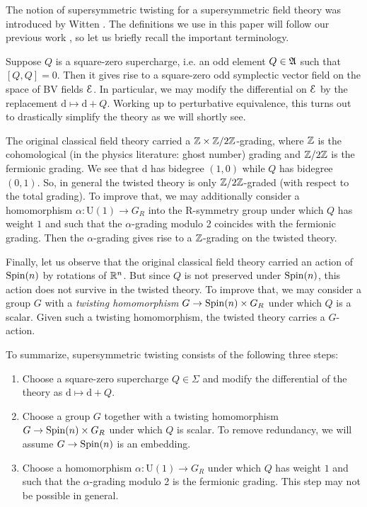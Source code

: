 \documentclass[10pt, oneside]{article}
\renewcommand{\U}{\mathrm{U}}
\begin{document}
The notion of supersymmetric twisting for a supersymmetric field theory was introduced by Witten \cite{WittenTQFT}. The definitions we use in this paper will follow our previous work \cite{ElliottSafronov}, so let us briefly recall the important terminology.

Suppose $Q$ is a square-zero supercharge, i.e. an odd element $Q\in\mathfrak A$ such that $[Q, Q]=0$. Then it gives rise to a square-zero odd symplectic vector field on the space of BV fields $\mathcal E$. In particular, we may modify the differential on $\mathcal E$ by the replacement $\mathrm{d}\mapsto \mathrm{d}+Q$. Working up to perturbative equivalence, this turns out to drastically simplify the theory as we will shortly see.

The original classical field theory carried a $\mathbb Z\times\mathbb Z/2\mathbb Z$-grading, where $\mathbb Z$ is the cohomological (in the physics literature: ghost number) grading and $\mathbb Z/2\mathbb Z$ is the fermionic grading. We see that $\mathrm{d}$ has bidegree $(1, 0)$ while $Q$ has bidegree $(0, 1)$. So, in general the twisted theory is only $\mathbb Z/2\mathbb Z$-graded (with respect to the total grading). To improve that, we may additionally consider a homomorphism $\alpha\colon \U(1)\rightarrow G_R$ into the R-symmetry group under which $Q$ has weight $1$ and such that the $\alpha$-grading modulo 2 coincides with the fermionic grading. Then the $\alpha$-grading gives rise to a $\mathbb Z$-grading on the twisted theory.

Finally, let us observe that the original classical field theory carried an action of $\mathrm{Spin}(n)$ by rotations of $\mathbb R^n$. But since $Q$ is not preserved under $\mathrm{Spin}(n)$, this action does not survive in the twisted theory. To improve that, we may consider a group $G$ with a \emph{twisting homomorphism} $G\rightarrow \mathrm{Spin}(n)\times G_R$ under which $Q$ is a scalar. Given such a twisting homomorphism, the twisted theory carries a $G$-action.

To summarize, supersymmetric twisting consists of the following three steps:


\begin{enumerate}
\item Choose a square-zero supercharge $Q\in\Sigma$ and modify the differential of the theory as $\mathrm{d}\mapsto\mathrm{d}+Q$.

\item Choose a group $G$ together with a twisting homomorphism $G\rightarrow \mathrm{Spin}(n)\times G_R$ under which $Q$ is scalar. To remove redundancy, we will assume $G\rightarrow \mathrm{Spin}(n)$ is an embedding.

\item Choose a homomorphism $\alpha\colon \U(1)\rightarrow G_R$ under which $Q$ has weight $1$ and such that the $\alpha$-grading modulo 2 is the fermionic grading. This step may not be possible in general.
\end{enumerate}
\end{document}
